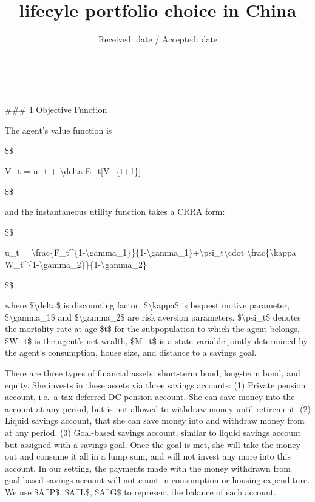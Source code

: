 \documentclass[smallextended]{svjour3}       %
\begin{document}
\title{lifecyle portfolio choice in China }



\author{  }


\institute{
    }

\date{Received: date / Accepted: date}


\maketitle

\begin{abstract}

\\
\keywords{
    }


\end{abstract}


\def\spacingset#1{\renewcommand{\baselinestretch}%
{#1}\small\normalsize} \spacingset{1}


\#\#\# 1 Objective Function

The agent's value function is

\$\$

V\_t = u\_t + \textbackslash delta E\_t{[}V\_\{t+1\}{]}

\$\$

and the instantaneous utility function takes a CRRA form:

\$\$

u\_t =
\textbackslash frac\{F\_t\^{}\{1-\textbackslash gamma\_1\}\}\{1-\textbackslash gamma\_1\}+\textbackslash psi\_t\textbackslash cdot
\textbackslash frac\{\textbackslash kappa
W\_t\^{}\{1-\textbackslash gamma\_2\}\}\{1-\textbackslash gamma\_2\}

\$\$

where \$\textbackslash delta\$ is discounting factor,
\$\textbackslash kappa\$ is bequest motive parameter,
\$\textbackslash gamma\_1\$ and \$\textbackslash gamma\_2\$ are risk
aversion parameters. \$\textbackslash psi\_t\$ denotes the mortality
rate at age \$t\$ for the subpopulation to which the agent belongs,
\$W\_t\$ is the agent's net wealth, \$M\_t\$ is a state variable jointly
determined by the agent's consumption, house size, and distance to a
savings goal.

There are three types of financial assets: short-term bond, long-term
bond, and equity. She invests in these assets via three savings
accounts: (1) Private pension account, i.e.~a tax-deferred DC pension
account. She can save money into the account at any period, but is not
allowed to withdraw money until retirement. (2) Liquid savings account,
that she can save money into and withdraw money from at any period. (3)
Goal-based savings account, similar to liquid savings account but
assigned with a savings goal. Once the goal is met, she will take the
money out and consume it all in a lump sum, and will not invest any more
into this account. In our setting, the payments made with the money
withdrawn from goal-based savings account will not count in consumption
or housing expenditure. We use \$A\^{}P\$, \$A\^{}L\$, \$A\^{}G\$ to
represent the balance of each account.
\end{document}
